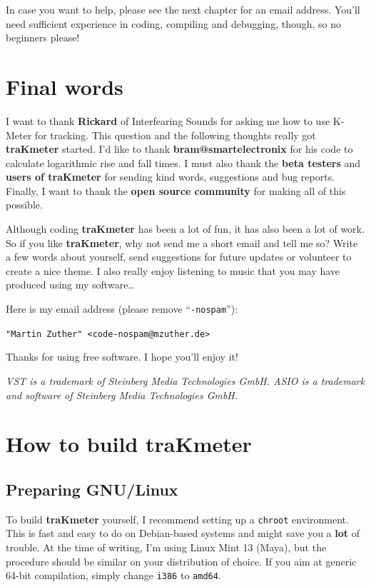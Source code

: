 In case you want to help, please see the next chapter for an email
address.  You’ll need sufficient experience in coding, compiling and
debugging, though, so no beginners please!

\chapter{Final words}
\label{chap:final_words}

I want to thank \textbf{Rickard} of Interfearing Sounds for asking me
how to use K-Meter for tracking.  This question and the following
thoughts really got \textbf{traKmeter} started.  I'd like to thank
\textbf{bram@smartelectronix} for his code to calculate logarithmic
rise and fall times.  I must also thank the \textbf{beta testers} and
\textbf{users of traKmeter} for sending kind words, suggestions and
bug reports.  Finally, I want to thank the \textbf{open source
  community} for making all of this possible.

Although coding \textbf{traKmeter} has been a lot of fun, it has also
been a lot of work.  So if you like \textbf{traKmeter}, why not send
me a short email and tell me so?  Write a few words about yourself,
send suggestions for future updates or volunteer to create a nice
theme.  I also really enjoy listening to music that you may have
produced using my software\dots

Here is my email address (please remove ``\texttt{-nospam}''):

\begin{center}
  \texttt{"Martin Zuther" <code-nospam@mzuther.de>}
\end{center}

Thanks for using free software.  I hope you'll enjoy it!

\emph{VST is a trademark of Steinberg Media Technologies GmbH.  ASIO
  is a trademark and software of Steinberg Media Technologies GmbH.}

\appendix

\chapter{How to build traKmeter}
\label{chap:build_trakmeter}

\section{Preparing GNU/Linux}

To build \textbf{traKmeter} yourself, I recommend setting up a
\texttt{chroot} environment.  This is fast and easy to do on
Debian-based systems and might save you a \textbf{lot} of trouble.  At
the time of writing, I'm using Linux Mint 13 (Maya), but the procedure
should be similar on your distribution of choice.  If you aim at
generic \num{64}-bit compilation, simply change \texttt{i386} to
\texttt{amd64}.

